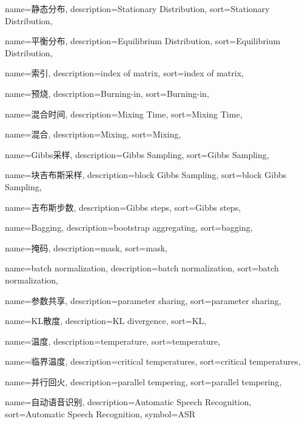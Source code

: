 {
  name=静态分布,
  description={Stationary Distribution},
  sort={Stationary Distribution},
}

{
  name=平衡分布,
  description={Equilibrium Distribution},
  sort={Equilibrium Distribution},
}

{
  name=索引,
  description={index of matrix},
  sort={index of matrix},
}

{
  name=预烧,
  description={Burning-in},
  sort={Burning-in},
}

{
  name=混合时间,
  description={Mixing Time},
  sort={Mixing Time},
}

{
  name=混合,
  description={Mixing},
  sort={Mixing},
}

{
  name=Gibbs采样,
  description={Gibbs Sampling},
  sort={Gibbs Sampling},
}

{
  name=块吉布斯采样,
  description={block Gibbs Sampling},
  sort={block Gibbs Sampling},
}

{
  name=吉布斯步数,
  description={Gibbs steps},
  sort={Gibbs steps},
}

{
  name=Bagging,
  description={bootstrap aggregating},
  sort={bagging},
}

{
  name=掩码,
  description={mask},
  sort={mask},
}

{
  name=batch normalization,
  description={batch normalization},
  sort={batch normalization},
}

{
  name=参数共享,
  description={parameter sharing},
  sort={parameter sharing},
}

{
  name=KL散度,
  description={KL divergence},
  sort={KL},
}

{
  name=温度,
  description={temperature},
  sort={temperature},
}

{
  name=临界温度,
  description={critical temperatures},
  sort={critical temperatures},
}

{
  name=并行回火,
  description={parallel tempering},
  sort={parallel tempering},
}

{
  name=自动语音识别,
  description={Automatic Speech Recognition},
  sort={Automatic Speech Recognition},
  symbol={ASR}
}

